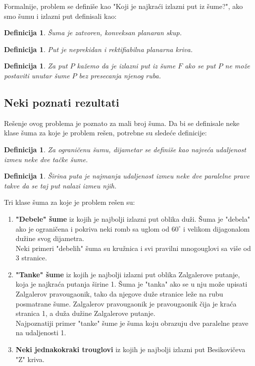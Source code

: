 \documentclass[11pt,letter]{article}
\newtheorem{df}[teo]{\bf Definicija}
\begin{document}
\indent Formalnije, problem se defini\v se kao "Koji je najkra\' ci izlazni put iz \v sume?", ako smo \v sumu i izlazni put definisali kao:
\begin{df} \v Suma je zatvoren, konveksan planaran skup. \end{df}
\begin{df} Put je neprekidan i rektifiabilna planarna kriva.\end{df}
\begin{df} Za put $P$ ka\v zemo da je izlazni put iz \v sume $F$ ako se put $P$ ne mo\v ze postaviti unutar \v sume $P$ bez presecanja njenog ruba.  \end{df}
\subsection[Neki poznati rezultati]{Neki poznati rezultati}
\bigskip
Re\v senje ovog problema je poznato za mali broj \v suma. Da bi se definisale neke klase \v suma za koje je problem re\v sen, potrebne su slede\' ce definicije:
\begin{df} Za ograni\v cenu \v sumu, dijametar se defini\v se kao najve\' ca udaljenost izme\dj u neke dve ta\v cke \v sume.\end{df}
\begin{df} \v Sirina puta je najmanja udaljenost izme\dj u neke dve paralelne prave takve da se taj put nalazi izme\dj u njih. \end{df}

Tri klase \v suma za koje je problem re\v sen su:
\begin{enumerate}
\item \textbf{"Debele" \v sume} iz kojih je najbolji izlazni put oblika du\v zi. \v Suma je "debela" ako je ograni\v cena i pokriva neki romb sa uglom od $60^\circ$ i velikom dijagonalom du\v zine svog dijametra.
\\
Neki primeri  "debelih" \v suma su kru\v znica i svi pravilni mnogouglovi sa vi\v se od 3 stranice.
\item \textbf{"Tanke" \v sume} iz kojih je najbolji izlazni put oblika Zalgalerove putanje, koja je najkra\' ca putanja \v sirine 1. \v Suma je "tanka" ako se u nju mo\v ze upisati Zalgalerov pravougaonik, tako da njegove du\v ze stranice le\v ze na rubu posmatrane \v sume. Zalgalerov pravougaonik je pravougaonik \v cija je kra\' ca stranica 1, a du\v za du\v zine Zalgalerove putanje.
\\
Najpoznatiji primer "tanke" \v sume je \v suma koju obrazuju dve paralelne prave na udaljenosti 1.
\item \textbf{Neki jednakokraki trouglovi} iz kojih je najbolji izlazni put Besikovi\v ceva "Z" kriva.
\end{enumerate}
\smallskip
\end{document}
